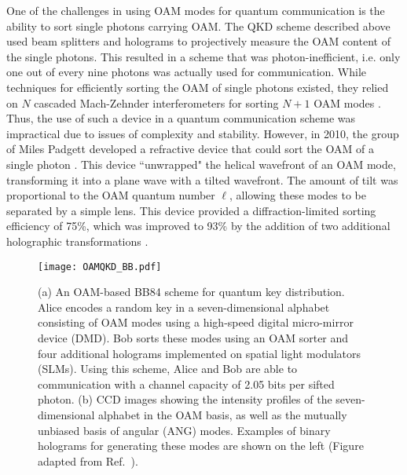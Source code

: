 \documentclass{article}
\begin{document}
One of the challenges in using OAM modes for quantum communication is the ability to sort single photons carrying OAM. The QKD scheme described above used beam splitters and holograms to projectively measure the OAM content of the single photons. This resulted in a scheme that was photon-inefficient, i.e. only one out of every nine photons was actually used for communication. While techniques for efficiently sorting the OAM of single photons existed, they relied on $N$ cascaded Mach-Zehnder interferometers for sorting $N+1$ OAM modes \cite{Leach:2002wy}. Thus, the use of such a device in a quantum communication scheme was impractical due to issues of complexity and stability. However, in 2010, the group of Miles Padgett developed a refractive device that could sort the OAM of a single photon \cite{Berkhout:2010cb}. This device ``unwrapped" the helical wavefront of an OAM mode, transforming it into a plane wave with a tilted wavefront. The amount of tilt was proportional to the OAM quantum number $\ell$, allowing these modes to be separated by a simple lens. This device provided a diffraction-limited sorting efficiency of 75\%, which was improved to 93\% by the addition of two additional holographic transformations \cite{Mirhosseini:2013em}.

\begin{figure}[h!]
\centering
\texttt{[image: OAMQKD\_BB.pdf]}
\caption{(a) An OAM-based BB84 scheme for quantum key distribution. Alice encodes a random key in a seven-dimensional alphabet consisting of OAM modes using a high-speed digital micro-mirror device (DMD). Bob sorts these modes using an OAM sorter and four additional holograms implemented on spatial light modulators (SLMs). Using this scheme, Alice and Bob are able to communication with a channel capacity of 2.05 bits per sifted photon. (b) CCD images showing the intensity profiles of the seven-dimensional alphabet in the OAM basis, as well as the mutually unbiased basis of angular (ANG) modes. Examples of binary holograms for generating these modes are shown on the left (Figure adapted from Ref.~\cite{Mirhosseini:2015fy}).}
\label{fig:OAMQKD}
\end{figure}
\end{document}
